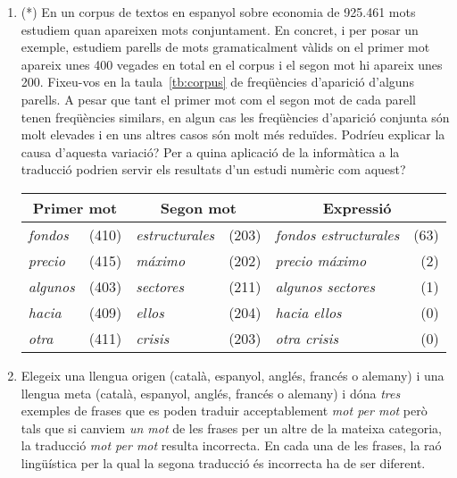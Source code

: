 \begin{enumerate}
\item (*) En un corpus de textos en espanyol sobre economia de 925.461
      mots estudiem quan apareixen mots conjuntament. En concret, i
      per posar un exemple, estudiem parells de mots gramaticalment
      vàlids on el primer mot apareix unes 400 vegades en total en el
      corpus i el segon mot hi apareix unes 200.  Fixeu-vos en la
      taula~\ref{tb:corpus} de freqüències d'aparició d'alguns
      parells. A pesar que tant el primer mot com el segon mot de cada
      parell tenen freqüències similars, en algun cas les
      freqüències d'aparició conjunta són molt elevades i en uns
      altres casos són molt més reduïdes.  Podríeu explicar la causa
      d'aquesta variació? Per a quina aplicació de la informàtica a la
      traducció podrien servir els resultats d'un estudi numèric com
      aquest?
  \begin{table*}
  \begin{center}
  \begin{tabular}{lr|lr|lr}
  \hline\hline
  \multicolumn{2}{c|}{\textsf{Primer mot}} &
  \multicolumn{2}{c|}{\textsf{Segon mot}} & 
  \multicolumn{2}{c}{\textsf{Expressió}}
   \\
  \hline
  \emph{fondos} & (410) & \emph{estructurales} & (203) & \emph{fondos
  estructurales} & (63) \\
  \emph{precio} & (415) & \emph{máximo} & (202) & \emph{precio máximo}
  & (2) \\
  \emph{algunos} & (403) & \emph{sectores} & (211) & \emph{algunos
  sectores} & (1) \\
  \emph{hacia} & (409) & \emph{ellos} & (204) & \emph{hacia ellos} &
  (0) \\
  \emph{otra} & (411) & \emph{crisis} & (203) & \emph{otra crisis} &
  (0) \\

  \hline
  \end{tabular}
  \end{center}
  \caption{Freqüències d'aparició de parells de mots sobre economia.}
  \label{tb:corpus}
  \end{table*}

\item Elegeix una llengua origen (català, espanyol, anglés, francés o
  alemany) i una llengua meta (català, espanyol, anglés, francés o   
  alemany) i dóna \emph{tres} exemples de frases que es poden traduir
  acceptablement \emph{mot per mot} però tals que si canviem \emph{un
    mot} de les frases per un altre de la mateixa categoria, la
  traducció \emph{mot per mot} resulta incorrecta. En cada una de les
  frases, la raó lingüística per la qual la segona traducció és
  incorrecta ha de ser diferent.


\end{enumerate}
